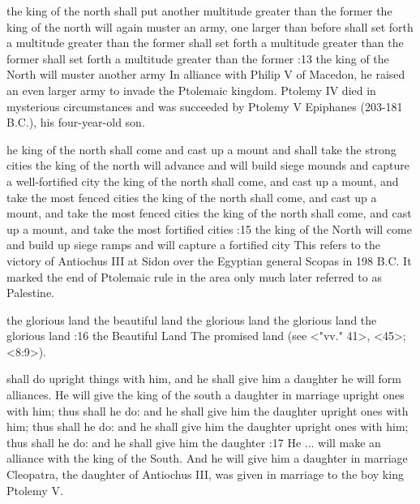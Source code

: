     {the king of the north shall put another multitude greater than the former} %
    {the king of the north will again muster an army, one larger than before} %
    {shall set forth a multitude greater than the former} %
    {shall set forth a multitude greater than the former} %
    {shall set forth a multitude greater than the former} %
:13 {the king of the North will muster another army}
In alliance with Philip V of Macedon, he raised an even larger army to 
invade the Ptolemaic kingdom. Ptolemy IV died in mysterious circumstances and was succeeded by
Ptolemy V Epiphanes (203-181  B.C.), his four-year-old son.

    {he king of the north shall come and cast up a mount and shall take the strong cities} %
    {the king of the north will advance and will build siege mounds and capture a well-fortified city} %
    {the king of the north shall come, and cast up a mount, and take the most fenced cities} %
    {the king of the north shall come, and cast up a mount, and take the most fenced cities} %
    {the king of the north shall come, and cast up a mount, and take the most fortified cities} %
:15 {the king of the North will come and build up siege ramps and will capture a fortified city} 
This refers to the victory of Antiochus III at Sidon over the Egyptian general Scopas in 198 B.C. 
It marked the end of Ptolemaic rule in the area only much later referred to as Palestine.

    {the glorious land} %
    {the beautiful land} %
    {the glorious land} %
    {the glorious land} %
    {the glorious land} %
:16 {the Beautiful Land} The promised land (see <"vv." 41>, <45>; <8:9>).


    {shall do upright things with him, and he shall give him a daughter}  %
    {he will form alliances. He will give the king of the south a daughter in marriage}  %
    {upright ones with him; thus shall he do: and he shall give him the daughter}  %
    {upright ones with him; thus shall he do: and he shall give him the daughter}  %
    {upright ones with him; thus shall he do: and he shall give him the daughter}  %
:17 {He ... will make an alliance with the king of the South. And he will give him a daughter in marriage} 
Cleopatra, the daughter of Antiochus III, was given in marriage to the boy king Ptolemy V. 

